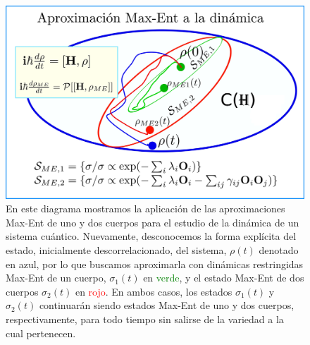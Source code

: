 \documentclass{report} %
\numberwithin{equation}{section}
\begin{document}
\begin{figure}
    \centering
    \includegraphics[scale=0.2]{figs/aprox-ME2_page-0001.jpg}
    \caption{En este diagrama mostramos la aplicación de las aproximaciones Max-Ent de uno y dos cuerpos para el estudio de la dinámica de un sistema cuántico. Nuevamente, desconocemos la forma explícita del estado, inicialmente descorrelacionado, del sistema, $\rho(t)$ denotado en azul, por lo que buscamos aproximarla con dinámicas restringidas Max-Ent de un cuerpo, $\sigma_1(t)$ en \textcolor{green}{verde}, y el estado Max-Ent de dos cuerpos  $\sigma_2(t)$ en \textcolor{red}{rojo}. En ambos casos, los estados $\sigma_1(t)$ y $\sigma_2(t)$ continuarán siendo estados Max-Ent de uno y dos cuerpos, respectivamente, para todo tiempo sin salirse de la variedad a la cual pertenecen. }
    \label{aprox-ME2_page-0001}
\end{figure}

\end{document}
